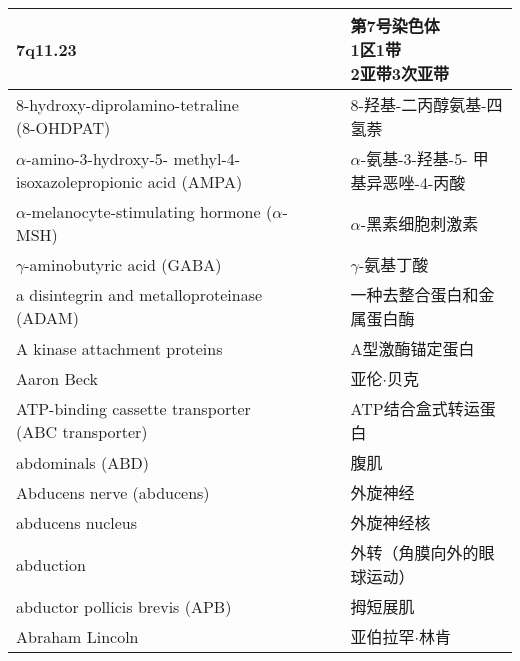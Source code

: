 \begin{longtable}{lll}
 	\midrule
 	7q11.23    && \makecell[l]{第7号染色体\\1区1带\\2亚带3次亚带}   \\
 	
 	\midrule
 	\makecell[l]{8-hydroxy-diprolamino-tetraline\\ (8-OHDPAT)}    && 8-羟基-二丙醇氨基-四氢萘   \\
 	
 	\midrule
 	\makecell[l]{$\alpha$-amino-3-hydroxy-5-\\methyl-4-isoxazolepropionic acid (AMPA)}   && \makecell[l]{$\alpha$-氨基-3-羟基-5-\\甲基异恶唑-4-丙酸}   \\
 	
 	\midrule
 	$\alpha$-melanocyte-stimulating hormone ($\alpha$-MSH)    && $\alpha$-黑素细胞刺激素   \\
 	
 	\midrule
 	$\gamma$-aminobutyric acid (GABA)    && $\gamma$-氨基丁酸   \\
 	
 	\midrule
 	a disintegrin and metalloproteinase (ADAM)    && 一种去整合蛋白和金属蛋白酶   \\
 	
 	\midrule
 	A kinase attachment proteins     && A型激酶锚定蛋白   \\
 	
 	\midrule
 	Aaron Beck     && 亚伦$\cdot$贝克   \\
 	
 	\midrule
 	\makecell[l]{ATP-binding cassette transporter\\ (ABC transporter)}     && ATP结合盒式转运蛋白   \\
 	
 	\midrule
 	abdominals (ABD)     && 腹肌   \\
 
 	\midrule
 	Abducens nerve (abducens)     && 外旋神经   \\
 	
 	\midrule
 	abducens nucleus     && 外旋神经核   \\
 
 	\midrule
 	abduction     && 外转（角膜向外的眼球运动）   \\
 	
 	\midrule
 	abductor pollicis brevis (APB)     && 拇短展肌   \\
 	
 	\midrule
 	Abraham Lincoln     && 亚伯拉罕$\cdot$林肯   \\
 	

\end{longtable}
